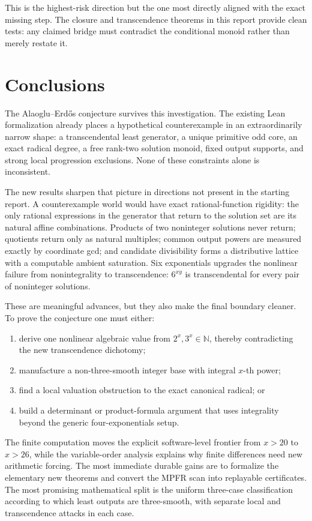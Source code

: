 \documentclass[11pt,oneside]{article}
\theoremstyle{definition}
\newcommand{\N}{\mathbb N}
\begin{document}
This is the highest-risk direction but the one most directly aligned with the exact missing
step.  The closure and transcendence theorems in this report provide clean tests: any
claimed bridge must contradict the conditional monoid rather than merely restate it.

\section{Conclusions}\label{sec:conclusion}

The Alaoglu--Erd\H{o}s conjecture survives this investigation.  The existing Lean
formalization already places a hypothetical counterexample in an extraordinarily narrow
shape: a transcendental least generator, a unique primitive odd core, an exact radical
degree, a free rank-two solution monoid, fixed output supports, and strong local
progression exclusions.  None of these constraints alone is inconsistent.

The new results sharpen that picture in directions not present in the starting report.
A counterexample world would have exact rational-function rigidity: the only rational
expressions in the generator that return to the solution set are its natural affine
combinations.  Products of two noninteger solutions never return; quotients return only as
natural multiples; common output powers are measured exactly by coordinate gcd; and
candidate divisibility forms a distributive lattice with a computable ambient saturation.
Six exponentials upgrades the nonlinear failure from nonintegrality to transcendence:
\(6^{xy}\) is transcendental for every pair of noninteger solutions.

These are meaningful advances, but they also make the final boundary cleaner.  To prove the
conjecture one must either:
\begin{enumerate}
\item derive one nonlinear algebraic value from \(2^x,3^x\in\N\), thereby contradicting
the new transcendence dichotomy;
\item manufacture a non-three-smooth integer base with integral \(x\)-th power;
\item find a local valuation obstruction to the exact canonical radical; or
\item build a determinant or product-formula argument that uses integrality beyond the
generic four-exponentials setup.
\end{enumerate}

The finite computation moves the explicit software-level frontier from \(x>20\) to
\(x>26\), while the variable-order analysis explains why finite differences need new
arithmetic forcing.  The most immediate durable gains are to formalize the elementary new
theorems and convert the MPFR scan into replayable certificates.  The most promising
mathematical split is the uniform three-case classification according to which least
outputs are three-smooth, with separate local and transcendence attacks in each case.
\end{document}
